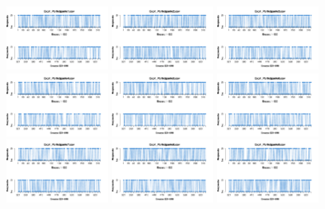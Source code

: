 \begin{figure}[th]
\centering
\includegraphics[width=0.30\textwidth]{Figures/Response_Exp1_P1} \includegraphics[width=0.30\textwidth]{Figures/Response_Exp1_P2} \includegraphics[width=0.30\textwidth]{Figures/Response_Exp1_P3}
\includegraphics[width=0.30\textwidth]{Figures/Response_Exp1_P4} \includegraphics[width=0.30\textwidth]{Figures/Response_Exp1_P5} \includegraphics[width=0.30\textwidth]{Figures/Response_Exp1_P6}
\includegraphics[width=0.30\textwidth]{Figures/Response_Exp1_P7} \includegraphics[width=0.30\textwidth]{Figures/Response_Exp1_P8} \includegraphics[width=0.30\textwidth]{Figures/Response_Exp1_P9}

\end{figure}
